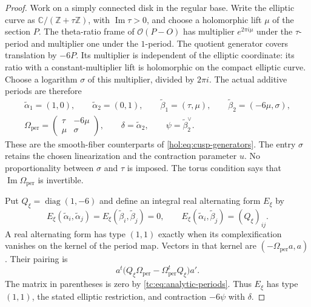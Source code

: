 \begin{proof}
Work on a simply connected disk in the regular base. Write the
elliptic curve as $\mathbb C/(\mathbb Z+\tau\mathbb Z)$, with
$\operatorname{Im}\tau>0$, and choose a holomorphic lift $\mu$
of the section $P$. The theta-ratio frame of
$\mathcal O(P-O)$ has multiplier $e^{2\pi i\mu}$ under the
$\tau$-period and multiplier one under the $1$-period.
The quotient generator covers translation by $-6P$.
Its multiplier is independent of the elliptic coordinate:
its ratio with a constant-multiplier lift is holomorphic on the
compact elliptic curve. Choose a logarithm $\sigma$ of this
multiplier, divided by $2\pi i$.
The actual additive periods are therefore
\begin{equation}\label{tc:eq:analytic-periods}
 \begin{gathered}
 \widetilde\alpha_1=(1,0),\qquad
 \widetilde\alpha_2=(0,1),\qquad
 \widetilde\beta_1=(\tau,\mu),\qquad
 \widetilde\beta_2=(-6\mu,\sigma),\\
 \Omega_{\mathrm{per}}=
       \begin{pmatrix}\tau&-6\mu\\ \mu&\sigma\end{pmatrix},
 \qquad \delta=\widetilde\alpha_2,
 \qquad \psi=\widetilde\beta_2^{\vee}.
 \end{gathered}
\end{equation}
These are the smooth-fiber counterparts of
\eqref{hol:eq:cusp-generators}. The entry $\sigma$ retains the
chosen linearization and the contraction parameter $u$.
No proportionality between $\sigma$ and $\tau$ is imposed.
The torus condition says that
$\operatorname{Im}\Omega_{\mathrm{per}}$ is invertible.

Put $Q_\xi=\operatorname{diag}(1,-6)$ and define an integral
real alternating form $E_\xi$ by
\begin{equation}\label{tc:eq:local-alternating-form}
 E_\xi(\widetilde\alpha_i,\widetilde\alpha_j)
 =E_\xi(\widetilde\beta_i,\widetilde\beta_j)=0,
 \qquad
 E_\xi(\widetilde\alpha_i,\widetilde\beta_j)=(Q_\xi)_{ij}.
\end{equation}
A real alternating form has type $(1,1)$ exactly when its
complexification vanishes on the kernel of the period map.
Vectors in that kernel are $(-\Omega_{\mathrm{per}}a,a)$.
Their pairing is
\[
 a^t\bigl(Q_\xi\Omega_{\mathrm{per}}
                  -\Omega_{\mathrm{per}}^tQ_\xi\bigr)a'.
\]
The matrix in parentheses is zero by
\eqref{tc:eq:analytic-periods}.
Thus $E_\xi$ has type $(1,1)$, the stated elliptic restriction,
and contraction $-6\psi$ with $\delta$.


\end{proof}
